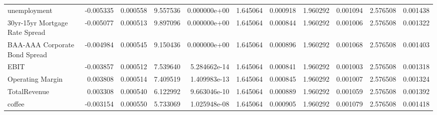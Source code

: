 \documentclass[12pt,a4paper,english]{article}
\begin{document}
{{\begin{tabular}{@{}lrrrrrrrrrr@{}}
			unemployment                   & -0.005335                & 0.000558                    & 9.557536                  & 0.000000e+00                             & 1.645064                      & 0.000918                      & 1.960292                     & 0.001094                     & 2.576508                     & 0.001438                     \\
			30yr-15yr Mortgage Rate Spread & -0.005077                & 0.000513                    & 9.897096                  & 0.000000e+00                             & 1.645064                      & 0.000844                      & 1.960292                     & 0.001006                     & 2.576508                     & 0.001322                     \\
			BAA-AAA Corporate Bond Spread  & -0.004984                & 0.000545                    & 9.150436                  & 0.000000e+00                             & 1.645064                      & 0.000896                      & 1.960292                     & 0.001068                     & 2.576508                     & 0.001403                     \\
			EBIT                           & -0.003857                & 0.000512                    & 7.539640                  & 5.284662e-14                             & 1.645064                      & 0.000841                      & 1.960292                     & 0.001003                     & 2.576508                     & 0.001318                     \\
			Operating Margin               & 0.003808                 & 0.000514                    & 7.409519                  & 1.409983e-13                             & 1.645064                      & 0.000845                      & 1.960292                     & 0.001007                     & 2.576508                     & 0.001324                     \\
			TotalRevenue                   & 0.003308                 & 0.000540                    & 6.122992                  & 9.663046e-10                             & 1.645064                      & 0.000889                      & 1.960292                     & 0.001059                     & 2.576508                     & 0.001392                     \\
			coffee                         & -0.003154                & 0.000550                    & 5.733069                  & 1.025948e-08                             & 1.645064                      & 0.000905                      & 1.960292                     & 0.001079                     & 2.576508                     & 0.001418                     \\

\end{tabular}}}
\end{document}
